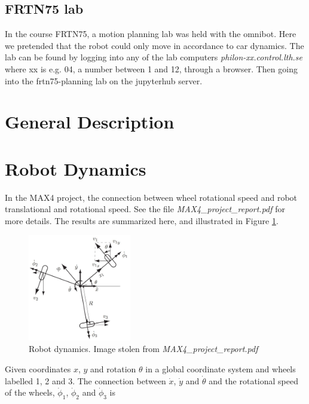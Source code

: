 \documentclass[10pt,a4paper]{article}
\begin{document}
	\subsection{FRTN75 lab}
	In the course FRTN75, a motion planning lab was held with the omnibot. Here we pretended that the robot could only move in accordance to car dynamics. The lab can be found by logging into any of the lab computers \textit{philon-xx.control.lth.se} where xx is e.g. 04, a number between 1 and 12, through a browser. Then going into the frtn75-planning lab on the jupyterhub server.
	
	\section{General Description}
	
	\section{Robot Dynamics}
	In the MAX4 project, the connection between wheel rotational speed and robot translational and rotational speed. See the file \textit{MAX4\_project\_report.pdf} for more details. The results are summarized here, and illustrated in Figure \ref{fig:dynamics}.
	
	\begin{figure}[h]
		\centering
		\includegraphics[width=0.4\textwidth]{figs/dynamics}
		\caption{Robot dynamics. Image stolen from \textit{MAX4\_project\_report.pdf}}
		\label{fig:dynamics}
	\end{figure}

	Given coordinates $x$, $y$ and rotation $\theta$ in a global coordinate system and wheels labelled 1, 2 and 3. The connection between $\dot{x}$, $\dot{y}$ and $\dot{\theta}$ and the rotational speed of the wheels, $\dot{\phi}_1$, $\dot{\phi}_2$ and $\dot{\phi}_3$ is
	
\end{document}
